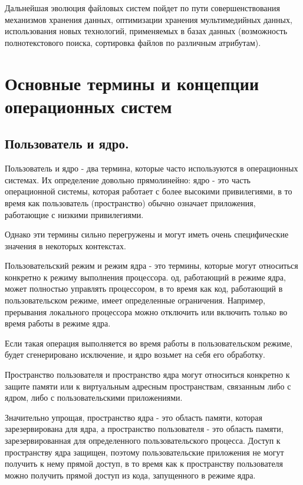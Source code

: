 \documentclass{article}
\begin{document}
    Дальнейшая эволюция файловых систем пойдет по пути совершенствования 
    механизмов хранения данных, оптимизации хранения мультимедийных данных, 
    использования новых технологий, применяемых в базах данных (возможность 
    полнотекстового поиска, сортировка файлов по различным атрибутам).

    \newpage

    \section{Основные термины и концепции \newline операционных систем}
    \subsection{Пользователь и ядро.}
    Пользователь и ядро - два термина, которые часто используются в 
    операционных системах. Их определение довольно прямолинейно: ядро - это
    часть операционной системы, которая работает с более высокими привилегиями, 
    в то время как пользователь (пространство) обычно означает приложения, 
    работающие с низкими привилегиями.

    Однако эти термины сильно перегружены и могут иметь очень специфические 
    значения в некоторых контекстах.

    Пользовательский режим и режим ядра - это термины, которые могут относиться 
    конкретно к режиму выполнения процессора. од, работающий в режиме ядра, 
    может полностью управлять процессором, в то время как код, работающий в 
    пользовательском режиме, имеет определенные ограничения. Например, 
    прерывания локального процессора можно отключить или включить 
    только во время работы в режиме ядра.

    Если такая операция выполняется во время работы в пользовательском режиме, 
    будет сгенерировано исключение, и ядро возьмет на себя его обработку.

    Пространство пользователя и пространство ядра могут относиться конкретно к 
    защите памяти или к виртуальным адресным пространствам, связанным либо с 
    ядром, либо с пользовательскими приложениями.

    Значительно упрощая, пространство ядра - это область памяти, которая 
    зарезервирована для ядра, а пространство пользователя - это область памяти, 
    зарезервированная для определенного пользовательского процесса. Доступ к 
    пространству ядра защищен, поэтому пользовательские приложения не могут 
    получить к нему прямой доступ, в то время как к пространству пользователя 
    можно получить прямой доступ из кода, запущенного в режиме ядра.
\end{document}
